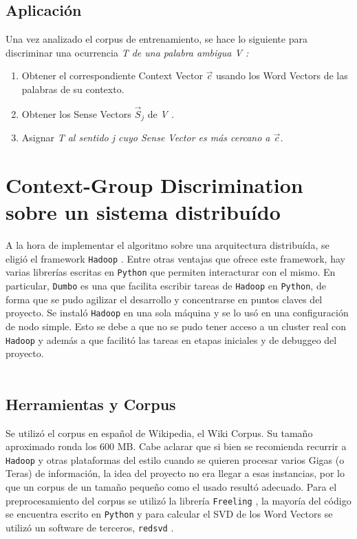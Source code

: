 \documentclass[10pt]{article}
\begin{document}
\subsection{Aplicación}
Una vez analizado el corpus de entrenamiento, se hace lo siguiente para discriminar una ocurrencia \em T \em de una palabra ambigua \em V \em:
\begin{enumerate}
\item Obtener el correspondiente Context Vector $\vec c$ usando los Word Vectors de las palabras de su contexto.
\item Obtener los Sense Vectors $\vec S_j$ de \em V \em.
\item Asignar \em T \em al sentido \em j \em cuyo Sense Vector es más cercano a $\vec c$.
\end{enumerate}

\section{Context-Group Discrimination sobre un sistema distribuído}
A la hora de implementar el algoritmo sobre una arquitectura distribuída, se eligió el framework \texttt{Hadoop} \cite{Had}.
Entre otras ventajas que ofrece este framework, hay varias librerías escritas en \texttt{Python} que permiten interacturar con el mismo. En particular, \texttt{Dumbo} \cite{Dum} es una que facilita escribir tareas de \texttt{Hadoop} en \texttt{Python}, de forma que se pudo agilizar el desarrollo y concentrarse en puntos claves del proyecto.
Se instaló \texttt{Hadoop} en una sola máquina y se lo usó en una configuración de nodo simple. Esto se debe a que no se pudo tener acceso a un cluster real con \texttt{Hadoop} y además a que facilitó las tareas en etapas iniciales y de debuggeo del proyecto.
\\
\\
\subsection{Herramientas y Corpus}
Se utilizó el corpus en español de Wikipedia, el Wiki Corpus. Su tamaño aproximado ronda los 600 MB.
Cabe aclarar que si bien se recomienda recurrir a \texttt{Hadoop} y otras plataformas del estilo cuando se quieren procesar varios Gigas (o Teras) de información, la idea del proyecto no era llegar a esas instancias, por lo que un corpus de un tamaño pequeño como el usado resultó adecuado.
Para el preprocesamiento del corpus se utilizó la librería \texttt{Freeling} \cite{Free}, la mayoría del código se encuentra escrito en \texttt{Python} y para calcular el SVD de los Word Vectors se utilizó un software de terceros, \texttt{redsvd} \cite{Red}.
\end{document}
